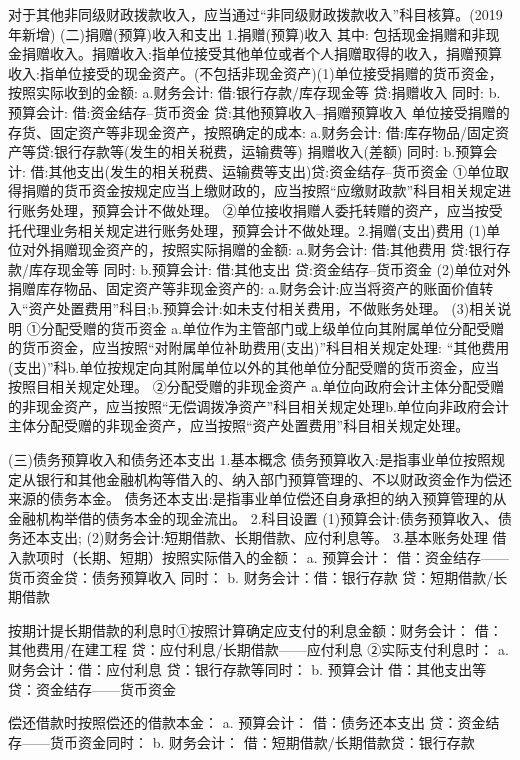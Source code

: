 \documentclass[UTF8,12pt]{ctexart}
\numberwithin{equation}{section} %
\numberwithin{figure}{section}
\numberwithin{table}{section}
\begin{document}
	对于其他非同级财政拨款收入，应当通过“非同级财政拨款收入”科目核算。(2019年新增)
	(二)捐赠(预算)收入和支出
	1.捐赠(预算)收入
	其中:
	包括现金捐赠和非现金捐赠收入。捐赠收入:指单位接受其他单位或者个人捐赠取得的收入，捐赠预算收入:指单位接受的现金资产。(不包括非现金资产)(1)单位接受捐赠的货币资金，按照实际收到的金额:
	a.财务会计:
	借:银行存款/库存现金等
	贷:捐赠收入
	同时:
	b.预算会计:
	借:资金结存--货币资金
	贷:其他预算收入--捐赠预算收入
	单位接受捐赠的存货、固定资产等非现金资产，按照确定的成本:
	a.财务会计:
	借:库存物品/固定资产等贷:银行存款等(发生的相关税费，运输费等)
	捐赠收入(差额)
	同时:
	b.预算会计:
	借:其他支出(发生的相关税费、运输费等支出)贷:资金结存--货币资金
	①单位取得捐赠的货币资金按规定应当上缴财政的，应当按照“应缴财政款”科目相关规定进行账务处理，预算会计不做处理。
	②单位接收捐赠人委托转赠的资产，应当按受托代理业务相关规定进行账务处理，预算会计不做处理。2.捐赠(支出)费用
	(1)单位对外捐赠现金资产的，按照实际捐赠的金额:
	a.财务会计:
	借:其他费用
	贷:银行存款/库存现金等
	同时:
	b.预算会计:
	借:其他支出
	贷:资金结存--货币资金
	(2)单位对外捐赠库存物品、固定资产等非现金资产的:
	a.财务会计:应当将资产的账面价值转入“资产处置费用”科目;b.预算会计:如未支付相关费用，不做账务处理。
	(3)相关说明
	①分配受赠的货币资金
	a.单位作为主管部门或上级单位向其附属单位分配受赠的货币资金，应当按照“对附属单位补助费用(支出)”科目相关规定处理:
	“其他费用(支出)”科b.单位按规定向其附属单位以外的其他单位分配受赠的货币资金，应当按照目相关规定处理。
	②分配受赠的非现金资产
	a.单位向政府会计主体分配受赠的非现金资产，应当按照“无偿调拨净资产”科目相关规定处理b.单位向非政府会计主体分配受赠的非现金资产，应当按照“资产处置费用”科目相关规定处理。
	
	(三)债务预算收入和债务还本支出
	1.基本概念
	债务预算收入:是指事业单位按照规定从银行和其他金融机构等借入的、纳入部门预算管理的、不以财政资金作为偿还来源的债务本金。
	债务还本支出:是指事业单位偿还自身承担的纳入预算管理的从金融机构举借的债务本金的现金流出。
	2.科目设置
	(1)预算会计:债务预算收入、债务还本支出;
	(2)财务会计:短期借款、长期借款、应付利息等。
	3.基本账务处理
	借入款项时（长期、短期）按照实际借入的金额：
	a.	预算会计：
	借：资金结存——货币资金贷：债务预算收入
	同时：
	b.	财务会计：借：银行存款
	贷：短期借款/长期借款
	
	按期计提长期借款的利息时①按照计算确定应支付的利息金额：财务会计：
	借：其他费用/在建工程
	贷：应付利息/长期借款——应付利息
	②实际支付利息时：
	a.	财务会计：借：应付利息
	贷：银行存款等同时：
	b.	预算会计
	借：其他支出等
	贷：资金结存——货币资金
	
	偿还借款时按照偿还的借款本金：
	a.	预算会计：
	借：债务还本支出
	贷：资金结存——货币资金同时：
	b.	财务会计：
	借：短期借款/长期借款贷：银行存款
	
\end{document}
